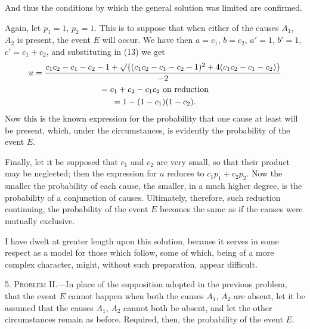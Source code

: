 \documentclass[oneside]{book}
\begin{document}
And thus the conditions by which the general solution was
limited are confirmed.

Again, let $p_1 = 1$, $p_2=1$. This is to suppose that when either
of the causes $A_1$, $A_2$ is present, the event $E$ will occur. We have
then $a = c_1$, $b = c_2$, $a' = 1$, $b' = 1$, $c'= c_1 + c_2$, and substituting in
(13) we get
\begin{gather*}
u=\frac{ c_1 c_2 - c_1 - c_2 - 1
       + \surd\{ (c_1 c_2 - c_1 - c_2 - 1)^2
               +4(c_1 c_2 - c_1 - c_2)      \} }{-2} \\
= c_1 + c_2 - c_1 c_2 \text{ on reduction}\\
= 1 - (1 - c_1) (1 - c_2).
\end{gather*}
Now this is the known expression for the probability that one
cause at least will be present, which, under the circumstances, is
evidently the probability of the event $E$.

Finally, let it be supposed that $c_1$ and $c_2$ are very small, so
that their product may be neglected; then the expression for $u$
reduces to $c_1 p_1 + c_2 p_2$. Now the smaller the probability of each
cause, the smaller, in a much higher degree, is the probability of
a conjunction of causes. Ultimately, therefore, such reduction
continuing, the probability of the event $E$ becomes the same as
if the causes were mutually exclusive.

I have dwelt at greater length upon this solution, because it
serves in some respect as a model for those which follow, some of
which, being of a more complex character, might, without such
preparation, appear difficult.

5. \textsc{Problem II}.---In place of the supposition adopted in the
previous problem, that the event $E$ cannot happen when both the
causes $A_1$, $A_2$ are absent, let it be assumed that the causes $A_1$, $A_2$
cannot both be absent, and let the other circumstances remain as
before. Required, then, the probability of the event $E$.
\end{document}
